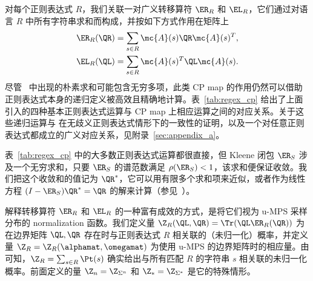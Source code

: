 对每个正则表达式 $R$，我们关联一对广义转移算符 $\ER_{R}$ 和 $\EL_{R}$，它们通过对语言 $R$ 中所有字符串求和而构成，并按如下方式作用在矩阵上
%
\begin{align}
\label{eq:transfer_op}
\ER_R(\QR) &= \sum_{s\in R} \mc{A}(s) \QR \mc{A}(s)^T, \nonumber\\
\EL_R(\QL) &= \sum_{s\in R} \mc{A}(s)^T \QL \mc{A}(s).
\end{align}
%
尽管~ 中出现的朴素求和可能包含无穷多项，此类 CP map 的作用仍然可以借助正则表达式本身的递归定义被高效且精确地计算。表~\ref{tab:regex_cp} 给出了上面引入的四种基本正则表达式运算与 CP map 上相应运算之间的对应关系。关于这些递归运算与  在无歧义正则表达式情形下的一致性的证明，以及一个对任意正则表达式都成立的广义对应关系，见附录~\ref{sec:appendix_a}。

表~\ref{tab:regex_cp} 中的大多数正则表达式运算都很直接，但 Kleene 闭包 $\ER_S$ 涉及一个无穷求和，只要 $\ER_S$ 的谱范数满足 $\rho(\ER_S) < 1$，该求和便保证收敛。我们把这个收敛和的值记为 $\QR^*$，它可以用有限多个求和项来近似，或者作为线性方程 $(I - \ER_S)\QR^* = \QR$ 的解来计算（参见~\citep{balle2019}）。

解释转移算符 $\ER_R$ 和 $\EL_R$ 的一种富有成效的方式，是将它们视为 u-MPS 采样分布的 normalization 函数。我们定义量 $\Z_R(\QL, \QR) = \Tr(\QL \ER_R(\QR))$ 为在边界矩阵 $\QL, \QR$ 存在时与正则表达式 $R$ 相关联的（未归一化）概率，并定义量 $\Z_R = \Z_R(\alphamat, \omegamat)$ 为使用 u-MPS 的边界矩阵时的相应量。由  可知，$\Z_R = \sum_{s \in R}\Pt(s)$ 确实给出与所有匹配 $R$ 的字符串 $s$ 相关联的未归一化概率。前面定义的量 $\Z_n = \Z_{\Sigma^n}$ 和 $\Z_* = \Z_{\Sigma^*}$ 是它的特殊情形。

